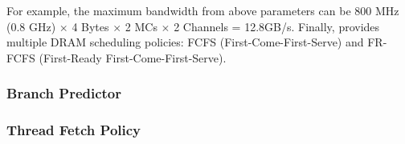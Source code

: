 For example, the maximum bandwidth from above parameters can
be \textsf{800 MHz (0.8 GHz)} $\times$ \textsf{4 Bytes}
$\times$ \textsf{2 MCs} $\times$ \textsf{2 Channels}
= \textsf{12.8GB/s}. Finally, \SIM provides multiple DRAM scheduling
policies: FCFS (First-Come-First-Serve) and FR-FCFS (First-Ready
First-Come-First-Serve).


\subsubsection{Branch Predictor}



\subsubsection{Thread Fetch Policy}

